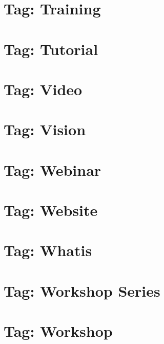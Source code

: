 \documentclass[twoside]{book}
\newcommand{\+}{\discretionary{\mbox{\scriptsize$\hookleftarrow$}}{}{}}
\begin{document}
\chapter{Tag\+: Training}
\label{md_markdown_tag_training}

\chapter{Tag\+: Tutorial}
\label{md_markdown_tag_tutorial}

\chapter{Tag\+: Video}
\label{md_markdown_tag_video}

\chapter{Tag\+: Vision}
\label{md_markdown_tag_vision}

\chapter{Tag\+: Webinar}
\label{md_markdown_tag_webinar}

\chapter{Tag\+: Website}
\label{md_markdown_tag_website}

\chapter{Tag\+: Whatis}
\label{md_markdown_tag_whatis}

\chapter{Tag\+: Workshop Series}
\label{md_markdown_tag_workshop-series}

\chapter{Tag\+: Workshop}
\label{md_markdown_tag_workshop}

\end{document}
